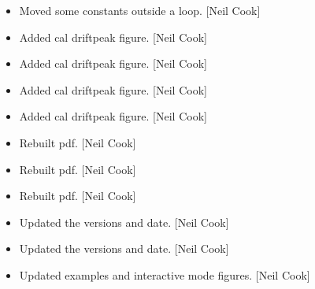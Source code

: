 \documentclass[a4paper,10pt,english]{report}
\begin{document}
\begin{itemize}
\item {} 
Moved some constants outside a loop. {[}Neil Cook{]}

\item {} 
Added cal driftpeak figure. {[}Neil Cook{]}

\item {} 
Added cal driftpeak figure. {[}Neil Cook{]}

\item {} 
Added cal driftpeak figure. {[}Neil Cook{]}

\item {} 
Added cal driftpeak figure. {[}Neil Cook{]}

\item {} 
Rebuilt pdf. {[}Neil Cook{]}

\item {} 
Rebuilt pdf. {[}Neil Cook{]}

\item {} 
Rebuilt pdf. {[}Neil Cook{]}

\item {} 
Updated the versions and date. {[}Neil Cook{]}

\item {} 
Updated the versions and date. {[}Neil Cook{]}

\item {} 
Updated examples and interactive mode figures. {[}Neil Cook{]}

\end{itemize}
\end{document}
